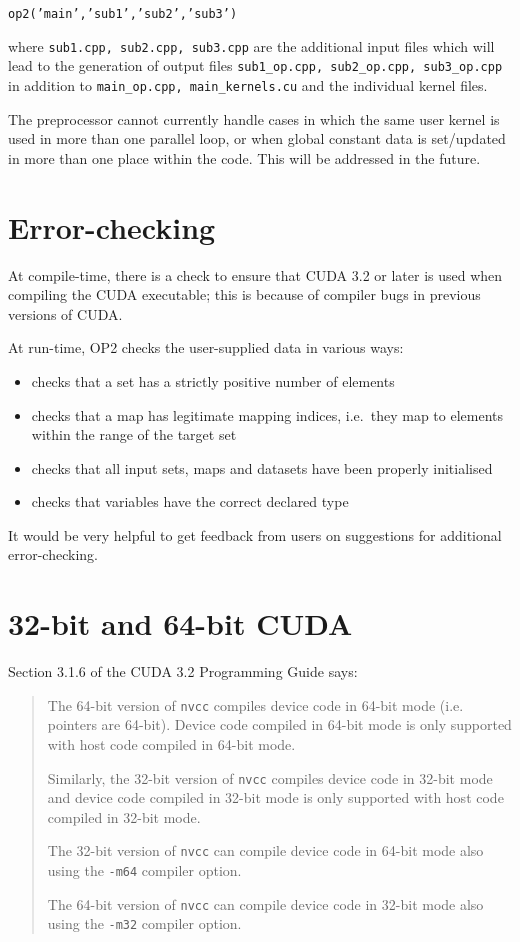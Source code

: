 \documentclass[11pt]{article}
\begin{document}
{\tt op2('main','sub1','sub2','sub3')}

\noindent
where {\tt sub1.cpp, sub2.cpp, sub3.cpp} are the additional input files which will 
lead to the generation of output files {\tt sub1\_op.cpp, sub2\_op.cpp, sub3\_op.cpp} 
in addition to {\tt main\_op.cpp, main\_kernels.cu} and the individual kernel files.

The preprocessor cannot currently handle cases in which the same user kernel is 
used in more than one parallel loop, or when global constant data is set/updated 
in more than one place within the code.  This will be addressed in the future.


\section{Error-checking}

At compile-time, there is a check to ensure that CUDA 3.2 or later is used
when compiling the CUDA executable; this is because of compiler bugs in previous
versions of CUDA.

At run-time, OP2 checks the user-supplied data in various ways:
\begin{itemize}
\item
checks that a set has a strictly positive number of elements
\item
checks that a map has legitimate mapping indices, 
i.e.~they map to elements within the range of the target set
\item
checks that all input sets, maps and datasets have been properly initialised
\item
checks that variables have the correct declared type
\end{itemize}



It would be very helpful to get feedback from users on suggestions for 
additional error-checking.


\newpage
\section{32-bit and 64-bit CUDA}

Section 3.1.6 of the CUDA 3.2 Programming Guide says:
\begin{quotation}
The 64-bit version of {\tt nvcc} compiles device code in 64-bit mode 
(i.e. pointers are 64-bit). Device code compiled in 64-bit mode 
is only supported with host code compiled in 64-bit mode.

Similarly, the 32-bit version of {\tt nvcc} compiles device code in 
32-bit mode and device code compiled in 32-bit mode is only 
supported with host code compiled in 32-bit mode.

The 32-bit version of {\tt nvcc} can compile device code in 64-bit mode 
also using the {\tt -m64} compiler option.

The 64-bit version of {\tt nvcc} can compile device code in 32-bit mode 
also using the {\tt -m32} compiler option.
\end{quotation}
\end{document}
